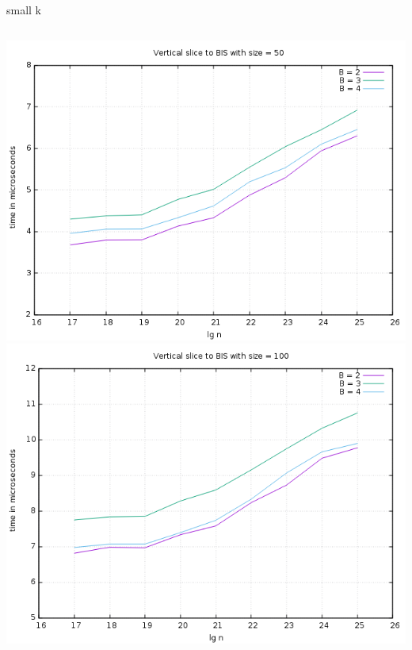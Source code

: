 \documentclass[pdf]{beamer}
\begin{document}
\begin{frame}{small k}
  \begin{columns}
    \includegraphics[scale=0.35]{pictures/analysis/comparing_BIS_50.png}
    \includegraphics[scale=0.35]{pictures/analysis/comparing_BIS_100.png}
  \end{columns}
\end{frame}
\end{document}
